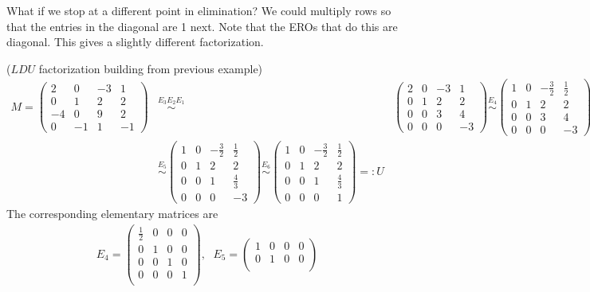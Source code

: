 \newpage
What if we stop at a different point in elimination? 
We could multiply rows so that the entries in the diagonal are 1 next. Note that the EROs that do this are diagonal. This gives a slightly different factorization.
\begin{example} \label{factorizes}($LDU$ factorization building from previous example)
\begin{align*}
M=
\begin{pmatrix}
2&0&-3&1\\
0&1&2&2\\
-4&0&9&2\\
0&-1&1&-1
\end{pmatrix}
&\stackrel{E_3E_2E_1}{\sim}&
\begin{pmatrix}
2&0&-3&1\\
0&1&2&2\\
0&0&3&4\\
0&0&0&-3
\end{pmatrix}
\stackrel{E_4}{\sim}
\begin{pmatrix}
1&0&-\frac{3}{2}&\frac{1}{2}\\
0&1&2&2\\
0&0&3&4\\
0&0&0&-3
\end{pmatrix}
\\[2mm]
&\stackrel{E_5}{\sim}
\begin{pmatrix}
1&0&-\frac{3}{2}&\frac{1}{2}\\
0&1&2&2\\
0&0&1&\frac43\\
0&0&0&-3
\end{pmatrix}
\stackrel{E_6}{\sim}
\begin{pmatrix}
1&0&-\frac{3}{2}&\frac{1}{2}\\
0&1&2&2\\
0&0&1&\frac43\\
0&0&0&1
\end{pmatrix}
=:U
\end{align*}
The corresponding elementary matrices are
\begin{align*}
E_4=
\begin{pmatrix}
\frac12&0&0&0\\
0&1&0&0\\
0&0&1&0\\
0&0&0&1\\
\end{pmatrix} , \, ~~
E_5=
\begin{pmatrix}
1&0&0&0\\
0&1&0&0\\

\end{pmatrix}
\end{align*}
\end{example}
